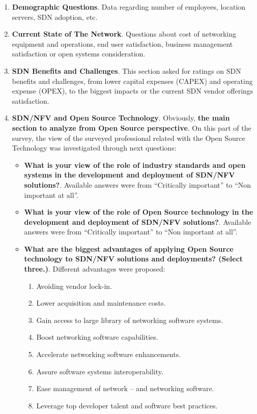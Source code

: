 \documentclass[a4paper, 12pt]{book}
\begin{document}
\begin{enumerate}\itemsep0pt
\item{\textbf{Demographic Questions}}. Data regarding number of employees, location servers, SDN adoption, etc.
\item{\textbf{Current State of The Network}}. Questions about cost of networking equipment and operations, end user satisfaction, business management satisfaction or open systems consideration.
\item{\textbf{SDN Benefits and Challenges}}. This section asked for ratings on SDN benefits and challenges, from lower capital expenses (CAPEX) and operating expense (OPEX), to the biggest impacts or the current SDN vendor offerings satisfaction.
\item{\textbf{SDN/NFV and Open Source Technology}}. Obviously, \textbf{the main section to analyze from Open Source perspective}. On this part of the survey, the view of the surveyed professional related with the Open Source Technology was investigated through next questions:
\begin{itemize}\itemsep0pt
\item{\textbf{What is your view of the role of industry standards and open systems in the development and deployment of SDN/NFV solutions?}}. Available answers were from ``Critically important'' to ``Non important at all''.
\item{\textbf{What is your view of the role of Open Source technology in the development and deployment of SDN/NFV solutions?}}. Available answers were from ``Critically important'' to ``Non important at all''.
\item{\textbf{What are the biggest advantages of applying Open Source technology to SDN/NFV solutions and deployments? (Select three.)}}. Different advantages were proposed:
\begin{enumerate}\itemsep0pt
\item{Avoiding vendor lock-in}.
\item{Lower acquisition and maintenance costs}.
\item{Gain access to large library of networking software systems}.
\item{Boost networking software capabilities}.
\item{Accelerate networking software enhancements}.
\item{Assure software systems interoperability}.
\item{Ease management of network -- and networking software}.
\item{Leverage top developer talent and software best practices}.

\end{enumerate}
\end{itemize}
\end{enumerate}
\end{document}
